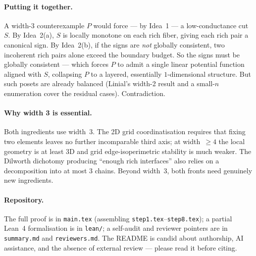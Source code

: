 \documentclass[11pt]{article}
\begin{document}
\paragraph{Putting it together.}
A width-$3$ counterexample $P$ would force --- by Idea~1 --- a
low-conductance cut $S$. By Idea~2(a), $S$ is locally monotone on
each rich fiber, giving each rich pair a canonical sign. By
Idea~2(b), if the signs are \emph{not} globally consistent, two
incoherent rich pairs alone exceed the boundary budget. So the signs
must be globally consistent --- which forces $P$ to admit a single
linear potential function aligned with $S$, collapsing $P$ to a
layered, essentially $1$-dimensional structure. But such posets are
already balanced (Linial's width-2 result and a small-$n$ enumeration
cover the residual cases). Contradiction.

\paragraph{Why width 3 is essential.}
Both ingredients use width~$3$. The 2D grid coordinatisation requires
that fixing two elements leaves no further incomparable third axis;
at width~$\ge 4$ the local geometry is at least 3D and grid
edge-isoperimetric stability is much weaker. The Dilworth dichotomy
producing ``enough rich interfaces'' also relies on a decomposition
into at most $3$ chains. Beyond width~$3$, both fronts need
genuinely new ingredients.

\paragraph{Repository.}
The full proof is in \texttt{main.tex} (assembling
\texttt{step1.tex}--\texttt{step8.tex}); a partial Lean~4
formalisation is in \texttt{lean/}; a self-audit and reviewer
pointers are in \texttt{summary.md} and \texttt{reviewers.md}. The
README is candid about authorship, AI assistance, and the absence of
external review --- please read it before citing.
\end{document}
